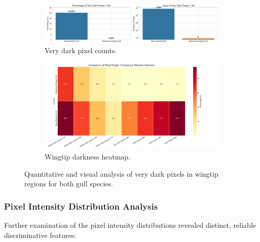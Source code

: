 \documentclass[a4paper,12pt]{report}
\begin{document}
\begin{figure}[H]
    \centering
    \begin{subfigure}[b]{0.48\textwidth}
        \centering
        \includegraphics[width=\textwidth]{images/REPORT_IMAGES_INTENSITY/I2/darkpixels.png}
        \caption{Very dark pixel counts.}
        \label{fig:dark_pixels}
    \end{subfigure}
    \hfill
    \begin{subfigure}[b]{0.48\textwidth}
        \centering
        \includegraphics[width=\textwidth]{images/REPORT_IMAGES_INTENSITY/I1/wingtip_darkness_heatmap.png}
        \caption{Wingtip darkness heatmap.}
        \label{fig:wingtip_heatmap}
    \end{subfigure}
    \caption{Quantitative and visual analysis of very dark pixels in wingtip regions for both gull species.}
    \label{fig:dark_pixel_heat_combined}
\end{figure}

\subsubsection{Pixel Intensity Distribution Analysis}
Further examination of the pixel intensity distributions revealed distinct, reliable discriminative features:
\end{document}
